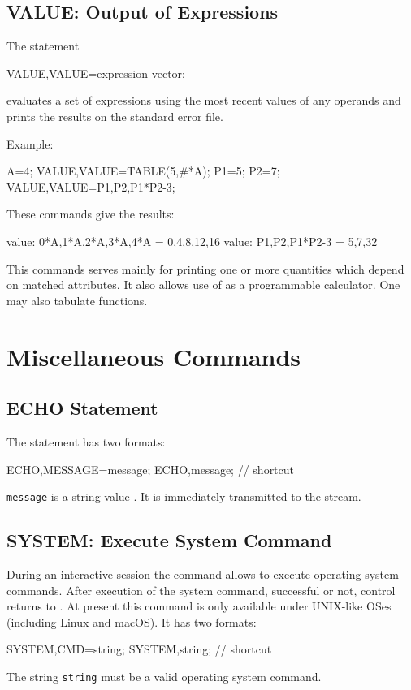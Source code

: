 \subsection{VALUE: Output of Expressions}
\label{sec:value}
The statement
\begin{example}
VALUE,VALUE=expression-vector;
\end{example}
evaluates a set of expressions using the most recent values of
any operands and prints the results on the standard error file.

\noindent Example:
\begin{example}
A=4;
VALUE,VALUE=TABLE(5,#*A);
P1=5;
P2=7;
VALUE,VALUE={P1,P2,P1*P2-3};
\end{example}
These commands give the results:
\begin{example}
value: {0*A,1*A,2*A,3*A,4*A} = {0,4,8,12,16}
value: {P1,P2,P1*P2-3} = {5,7,32}
\end{example}
This commands serves mainly for printing one or more quantities
which depend on matched attributes.
It also allows use of \opal as a programmable calculator.
One may also tabulate functions.


\section{Miscellaneous Commands}

\subsection{ECHO Statement}
\label{sec:echo}
The  statement has two formats:
\begin{example}
ECHO,MESSAGE=message;
ECHO,message;           // shortcut
\end{example}
\texttt{message} is a string value .
It is immediately transmitted to the  stream.

\subsection{SYSTEM: Execute System Command}
\label{sec:system}
During an interactive \opal session the command 
allows to execute operating system commands.
After execution of the system command, successful or not,
control returns to \opal.
At present this command is only available under UNIX-like OSes (including Linux and macOS).
It has two formats:
\begin{example}
SYSTEM,CMD=string;
SYSTEM,string;         // shortcut
\end{example}
The string  \texttt{string} must be a valid operating
system command.

